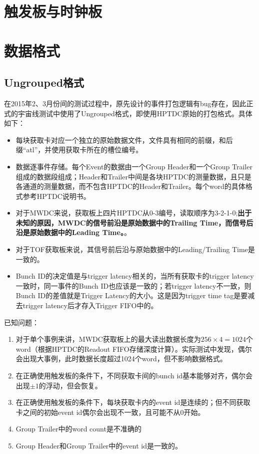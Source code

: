 \section{触发板与时钟板}

\section{数据格式}

\subsection{Ungrouped格式}
在2015年2、3月份间的测试过程中，原先设计的事件打包逻辑有bug存在，因此正式的宇宙线测试中使用了Ungrouped格式，即使用HPTDC原始的打包格式。具体如下：
\begin{itemize}
	\item 每块获取卡对应一个独立的原始数据文件，文件具有相同的前缀，和后缀“atl”，并使用获取卡所在的槽位编号。
	\item 数据逐事件存储。每个Event的数据由一个Group Header和一个Group Trailer组成的数据段组成；Header和Trailer中间是各块HPTDC的测量数据，且只是各通道的测量数据，而不包含HPTDC的Header和Trailer。每个word的具体格式参考HPTDC说明书。
	\item 对于MWDC来说，获取板上四片HPTDC从0-3编号，读取顺序为3-2-1-0;\textbf{出于未知的原因，MWDC的信号前沿是原始数据中的Trailing Time，而信号后沿是原始数据中的Leading Time。}。
	\item 对于TOF获取板来说，其信号前后沿与原始数据中的Leading/Trailing Time是一致的。
	\item Bunch ID的决定值是与trigger latency相关的，当所有获取卡的trigger latency一致时，同一事件的Bunch ID也应该是一致的；若trigger latency不一致，则Bunch ID的差值就是Trigger Latency的大小。这是因为trigger time tag是要减去trigger latency后才存入Trigger FIFO中的。
\end{itemize}

已知问题：
\begin{enumerate}
	\item 对于单个事例来讲，MWDC获取板上的最大读出数据长度为$256\times4=1024$个word（根据HPTDC的Readout FIFO存储深度计算）。实际测试中发现，偶尔会出现大事例，此时数据长度超过1024个word，但不影响数据格式。
	\item 在正确使用触发板的条件下，不同获取卡间的bunch id基本能够对齐，偶尔会出现$\pm 1$的浮动，但会恢复。
	\item 在正确使用触发板的条件下，每块获取卡内的event id是连续的；但不同获取卡之间的初始event id偶尔会出现不一致，且可能不从0开始。
	\item Group Trailer中的word count是不准确的
	\item Group Header和Group Trailer中的event id是一致的。
\end{enumerate}



